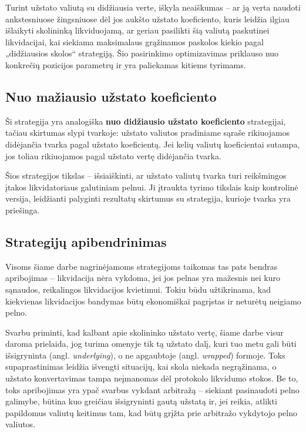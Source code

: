 \documentclass[]{VUMIFTemplateClass}
\begin{document}
Turint užstato valiutą su didžiausia verte, iškyla neaiškumas – ar ją verta naudoti ankstesniuose žingsniuose dėl jos aukšto užstato koeficiento, kuris leidžia ilgiau išlaikyti skolininką likviduojamą, ar geriau pasilikti šią valiutą paskutinei likvidacijai, kai siekiama maksimalaus grąžinamos paskolos kiekio pagal „didžiausios skolos“ strategiją. Šio pasirinkimo optimizavimas priklauso nuo konkrečių pozicijos parametrų ir yra paliekamas kitiems tyrimams.

\subsection{Nuo mažiausio užstato koeficiento}

Ši strategija yra analogiška \textbf{nuo didžiausio užstato koeficiento} strategijai, tačiau skirtumas slypi tvarkoje: užstato valiutos pradiniame sąraše rikiuojamos didėjančia tvarka pagal užstato koeficientą. Jei kelių valiutų koeficientai sutampa, jos toliau rikiuojamos pagal užstato vertę didėjančia tvarka.

Šios strategijos tikslas – išsiaiškinti, ar užstato valiutų tvarka turi reikšmingos įtakos likvidatoriaus galutiniam pelnui. Ji įtraukta tyrimo tikslais kaip kontrolinė versija, leidžianti palyginti rezultatų skirtumus su strategija, kurioje tvarka yra priešinga.

\subsection{Strategijų apibendrinimas}
Visoms šiame darbe nagrinėjamoms strategijoms taikomas tas pats bendras apribojimas – likvidacija nėra vykdoma, jei jos pelnas yra mažesnis nei kuro sąnaudos, reikalingos likvidacijos kvietimui. Tokiu būdu užtikrinama, kad kiekvienas likvidacijos bandymas būtų ekonomiškai pagrįstas ir neturėtų neigiamo pelno.

Svarbu priminti, kad kalbant apie skolininko užstato vertę, šiame darbe visur daroma prielaida, jog turima omenyje tik tą užstato dalį, kuri tuo metu gali būti išsigryninta (angl. \textit{underlying}), o ne apgaubtoje (angl. \textit{wrapped}) formoje. Toks supaprastinimas leidžia išvengti situacijų, kai skola niekada negrąžinama, o užstato konvertavimas tampa neįmanomas dėl protokolo likvidumo stokos. Be to, toks apribojimas yra ypač svarbus vykdant arbitražą – siekiant pasinaudoti pelno galimybe, būtina kuo greičiau išsigryninti gautą užstatą ir, jei reikia, atlikti papildomus valiutų keitimus tam, kad būtų grįžta prie arbitražo vykdytojo pelno valiutos.
\end{document}
